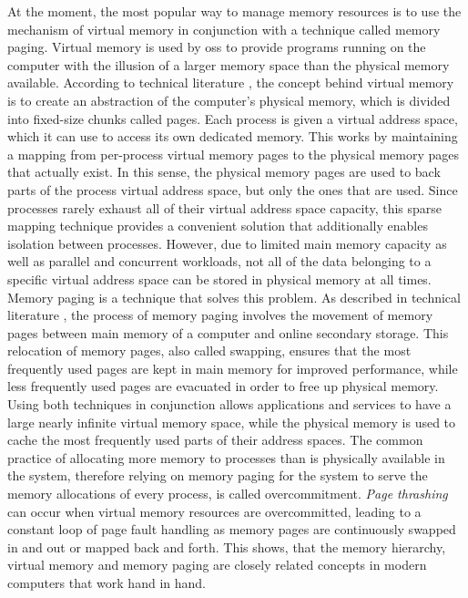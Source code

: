At the moment, the most popular way to manage memory resources is to use the mechanism of virtual memory in conjunction with a technique called memory paging.
Virtual memory is used by \acp{os} to provide programs running on the computer with the illusion of a larger memory space than the physical memory available.
According to technical literature \cite{mos2009}, the concept behind virtual memory is to create an abstraction of the computer's physical memory, which is divided into fixed-size chunks called pages.
Each process is given a virtual address space, which it can use to access its own dedicated memory.
This works by maintaining a mapping from per-process virtual memory pages to the physical memory pages that actually exist.
In this sense, the physical memory pages are used to back parts of the process virtual address space, but only the ones that are used.
Since processes rarely exhaust all of their virtual address space capacity, this sparse mapping technique provides a convenient solution that additionally enables isolation between processes.
However, due to limited main memory capacity as well as parallel and concurrent workloads, not all of the data belonging to a specific virtual address space can be stored in physical memory at all times.
Memory paging is a technique that solves this problem.
As described in technical literature \cite{mos2009}, the process of memory paging involves the movement of memory pages between main memory of a computer and online secondary storage.
This relocation of memory pages, also called swapping, ensures that the most frequently used pages are kept in main memory for improved performance, while less frequently used pages are evacuated in order to free up physical memory.
Using both techniques in conjunction allows applications and services to have a large nearly infinite virtual memory space, while the physical memory is used to cache the most frequently used parts of their address spaces.
The common practice of allocating more memory to processes than is physically available in the system, therefore relying on memory paging for the system to serve the memory allocations of every process, is called overcommitment.
\emph{Page thrashing} can occur when virtual memory resources are overcommitted, leading to a constant loop of page fault handling as memory pages are continuously swapped in and out or mapped back and forth.
This shows, that the memory hierarchy, virtual memory and memory paging are closely related concepts in modern computers that work hand in hand.

